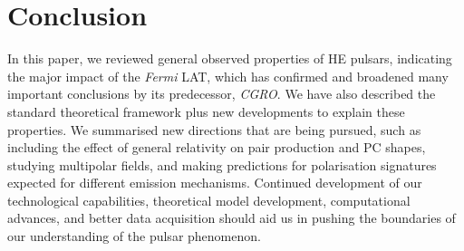 \documentclass{PoS}
\begin{document}
\section{Conclusion}\label{sec:Conc}
In this paper, we reviewed general observed properties of HE pulsars, indicating the major impact of the \textit{Fermi} LAT, which has confirmed and broadened many important conclusions by its predecessor, \textit{CGRO}. We have also described the standard theoretical framework plus new developments to explain these properties. We summarised new directions that are being pursued, such as including the effect of general relativity on pair production and PC shapes, studying multipolar fields, and making predictions for polarisation signatures expected for different emission mechanisms. Continued development of our technological capabilities, theoretical model development, computational advances, and better data acquisition should aid us in pushing the boundaries of our understanding of the pulsar phenomenon.
\end{document}

